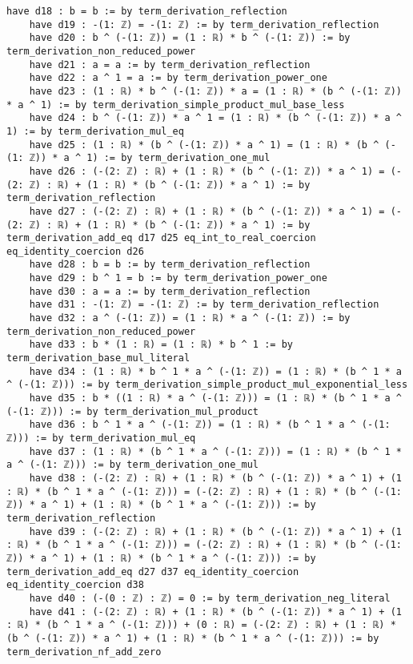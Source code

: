 \documentclass{article}
\begin{document}
\begin{tcolorbox}[colback=white!10, width=\linewidth]
\begin{lstlisting}[language=Lean4]
    have d18 : b = b := by term_derivation_reflection
    have d19 : -(1: ℤ) = -(1: ℤ) := by term_derivation_reflection
    have d20 : b ^ (-(1: ℤ)) = (1 : ℝ) * b ^ (-(1: ℤ)) := by term_derivation_non_reduced_power
    have d21 : a = a := by term_derivation_reflection
    have d22 : a ^ 1 = a := by term_derivation_power_one
    have d23 : (1 : ℝ) * b ^ (-(1: ℤ)) * a = (1 : ℝ) * (b ^ (-(1: ℤ)) * a ^ 1) := by term_derivation_simple_product_mul_base_less
    have d24 : b ^ (-(1: ℤ)) * a ^ 1 = (1 : ℝ) * (b ^ (-(1: ℤ)) * a ^ 1) := by term_derivation_mul_eq
    have d25 : (1 : ℝ) * (b ^ (-(1: ℤ)) * a ^ 1) = (1 : ℝ) * (b ^ (-(1: ℤ)) * a ^ 1) := by term_derivation_one_mul
    have d26 : (-(2: ℤ) : ℝ) + (1 : ℝ) * (b ^ (-(1: ℤ)) * a ^ 1) = (-(2: ℤ) : ℝ) + (1 : ℝ) * (b ^ (-(1: ℤ)) * a ^ 1) := by term_derivation_reflection
    have d27 : (-(2: ℤ) : ℝ) + (1 : ℝ) * (b ^ (-(1: ℤ)) * a ^ 1) = (-(2: ℤ) : ℝ) + (1 : ℝ) * (b ^ (-(1: ℤ)) * a ^ 1) := by term_derivation_add_eq d17 d25 eq_int_to_real_coercion eq_identity_coercion d26
    have d28 : b = b := by term_derivation_reflection
    have d29 : b ^ 1 = b := by term_derivation_power_one
    have d30 : a = a := by term_derivation_reflection
    have d31 : -(1: ℤ) = -(1: ℤ) := by term_derivation_reflection
    have d32 : a ^ (-(1: ℤ)) = (1 : ℝ) * a ^ (-(1: ℤ)) := by term_derivation_non_reduced_power
    have d33 : b * (1 : ℝ) = (1 : ℝ) * b ^ 1 := by term_derivation_base_mul_literal
    have d34 : (1 : ℝ) * b ^ 1 * a ^ (-(1: ℤ)) = (1 : ℝ) * (b ^ 1 * a ^ (-(1: ℤ))) := by term_derivation_simple_product_mul_exponential_less
    have d35 : b * ((1 : ℝ) * a ^ (-(1: ℤ))) = (1 : ℝ) * (b ^ 1 * a ^ (-(1: ℤ))) := by term_derivation_mul_product
    have d36 : b ^ 1 * a ^ (-(1: ℤ)) = (1 : ℝ) * (b ^ 1 * a ^ (-(1: ℤ))) := by term_derivation_mul_eq
    have d37 : (1 : ℝ) * (b ^ 1 * a ^ (-(1: ℤ))) = (1 : ℝ) * (b ^ 1 * a ^ (-(1: ℤ))) := by term_derivation_one_mul
    have d38 : (-(2: ℤ) : ℝ) + (1 : ℝ) * (b ^ (-(1: ℤ)) * a ^ 1) + (1 : ℝ) * (b ^ 1 * a ^ (-(1: ℤ))) = (-(2: ℤ) : ℝ) + (1 : ℝ) * (b ^ (-(1: ℤ)) * a ^ 1) + (1 : ℝ) * (b ^ 1 * a ^ (-(1: ℤ))) := by term_derivation_reflection
    have d39 : (-(2: ℤ) : ℝ) + (1 : ℝ) * (b ^ (-(1: ℤ)) * a ^ 1) + (1 : ℝ) * (b ^ 1 * a ^ (-(1: ℤ))) = (-(2: ℤ) : ℝ) + (1 : ℝ) * (b ^ (-(1: ℤ)) * a ^ 1) + (1 : ℝ) * (b ^ 1 * a ^ (-(1: ℤ))) := by term_derivation_add_eq d27 d37 eq_identity_coercion eq_identity_coercion d38
    have d40 : (-(0 : ℤ) : ℤ) = 0 := by term_derivation_neg_literal
    have d41 : (-(2: ℤ) : ℝ) + (1 : ℝ) * (b ^ (-(1: ℤ)) * a ^ 1) + (1 : ℝ) * (b ^ 1 * a ^ (-(1: ℤ))) + (0 : ℝ) = (-(2: ℤ) : ℝ) + (1 : ℝ) * (b ^ (-(1: ℤ)) * a ^ 1) + (1 : ℝ) * (b ^ 1 * a ^ (-(1: ℤ))) := by term_derivation_nf_add_zero

\end{lstlisting}
\end{tcolorbox}
\end{document}
